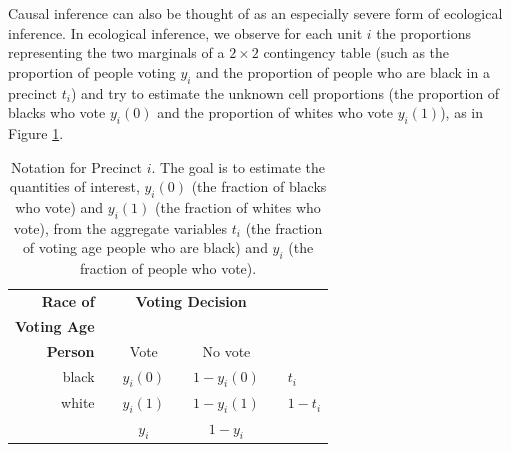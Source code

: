 \documentclass[11pt,titlepage]{article}
\begin{document}
Causal inference can also be thought of as an especially severe form
of ecological inference.  In ecological inference, we observe for each
unit $i$ the proportions representing the two marginals of a $2\times
2$ contingency table (such as the proportion of people voting $y_i$
and the proportion of people who are black in a precinct $t_i$) and
try to estimate the unknown cell proportions (the proportion of blacks
who vote $y_i(0)$ and the proportion of whites who vote
$y_i(1)$), as in Figure \ref{t:note}.
\begin{table}[t] 
\begin{center}
  \leavevmode \setlength{\extrarowheight}{4pt}
\begin{tabular}{r<{  }@{}r@{}c@{}l@{}c@{}c@{}>{  }l} 
  \textbf{Race of}&&\multicolumn{3}{c}{\textbf{Voting Decision}}\\
  \textbf{Voting Age} && &                   &&\\
  \textbf{Person} && \multicolumn{1}{c}{Vote} && No vote &
  \\\cline{2-5}
  black &\vline& $y_i(0)$ &\vline& $1-y_i(0)$ &\vline& $t_i$ \\
  \cline{2-5} white &\vline& $y_i(1)$ &\vline& $1-y_i(1)$
  &\vline&$1-t_i$\\ \cline{2-5}
  && $y_i$       &&       $1-y_i$  && \\
\end{tabular}
\caption{Notation for Precinct $i$.  The goal is to estimate the
  quantities of interest, $y_i(0)$ (the fraction of blacks who vote)
  and $y_i(1)$ (the fraction of whites who vote), from the aggregate
  variables $t_i$ (the fraction of voting age people who are black)
  and $y_i$ (the fraction of people who vote).}
\label{t:note}
\end{center}
\end{table}
\end{document}
